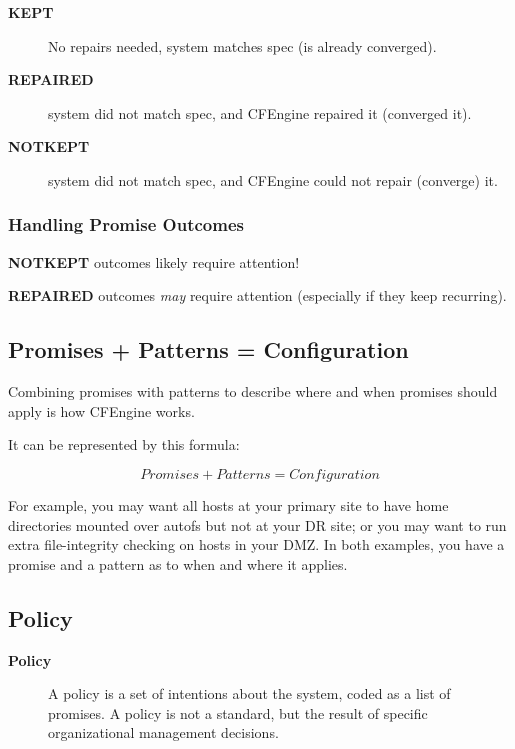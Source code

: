 \begin{description}
\item[\textbf{KEPT}] No repairs needed, system matches spec (is already converged).



\item[\textbf{REPAIRED}] system did not match spec, and CFEngine repaired it (converged it).



\item[\textbf{NOTKEPT}] system did not match spec, and CFEngine could not repair (converge) it.
\end{description}





\subsubsection{Handling Promise Outcomes}

\textbf{NOTKEPT} outcomes likely require attention!

\textbf{REPAIRED} outcomes \emph{may} require attention (especially if they keep recurring).





\subsection{Promises + Patterns = Configuration}

Combining promises with patterns to describe where and when promises
should apply is how CFEngine works.

It can be represented by this formula:

\[{Promises} {+} {Patterns} = {Configuration}\]

For example, you may want all hosts at your primary site to have
home directories mounted over autofs but not at your DR site;
or you may want to run extra file-integrity checking on hosts 
in your DMZ.  In both examples, you have a promise and a pattern
as to when and where it applies.





\subsection{Policy}

\begin{description}
\item[\textbf{Policy}] A policy is a set of intentions about the system, coded as a list of
promises. A policy is not a standard, but the result of specific
organizational management decisions.
\end{description}





